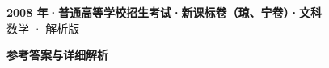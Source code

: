 \documentclass[zihao=-4, a4paper]{ctexart}
\begin{document}
\begin{center}
  {\Large\bfseries 2008 年·普通高等学校招生考试·新课标卷（琼、宁卷）·文科}\\[4pt]
  {\large 数学 · 解析版}
\end{center}
\medskip
{}

\clearpage
{}
\begin{center}{\Large\bfseries 参考答案与详细解析}\end{center}
\medskip

\end{document}
